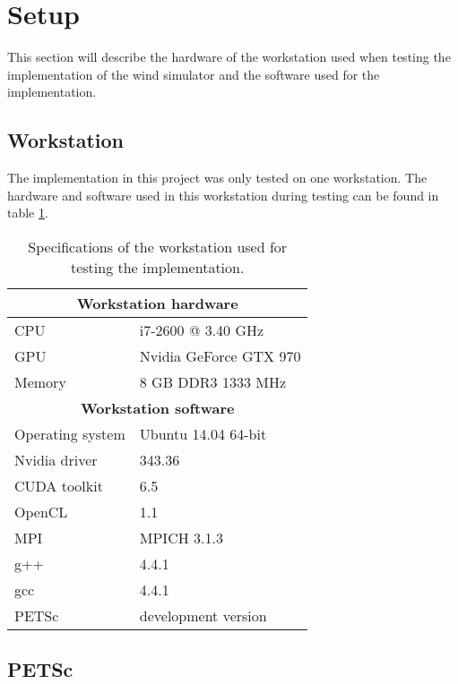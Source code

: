 \section{Setup}

This section will describe the hardware of the workstation used when testing the
implementation of the wind simulator and the software used for the
implementation.

\subsection{Workstation}

The implementation in this project was only tested on one workstation. The
hardware and software used in this workstation during testing can be found in
table \ref{table:test_pc}.

\begin{table}[h]
	\begin{center}
	\bgroup
	\def\arraystretch{1.2}
	\begin{tabular}{|l|l|}
		\hline
		\multicolumn{2}{|c|}{\textbf{Workstation hardware}} \\ \hline
		CPU & i7-2600 @ 3.40 GHz \\ \hline
		GPU & Nvidia GeForce GTX 970 \\ \hline
		Memory & 8 GB DDR3 1333 MHz \\ \hline
		\multicolumn{2}{|c|}{\textbf{Workstation software}} \\ \hline
		Operating system & Ubuntu 14.04 64-bit \\ \hline
		Nvidia driver & 343.36 \\ \hline
		CUDA toolkit & 6.5 \\ \hline
		OpenCL & 1.1 \\ \hline
		MPI & MPICH 3.1.3 \\ \hline
		g++ & 4.4.1 \\ \hline
		gcc & 4.4.1 \\ \hline
		PETSc & development version \\ \hline
	\end{tabular}
	\egroup
	\end{center}
	\caption{Specifications of the workstation used for testing the implementation.}
	\label{table:test_pc}
\end{table}

\subsection{PETSc}

